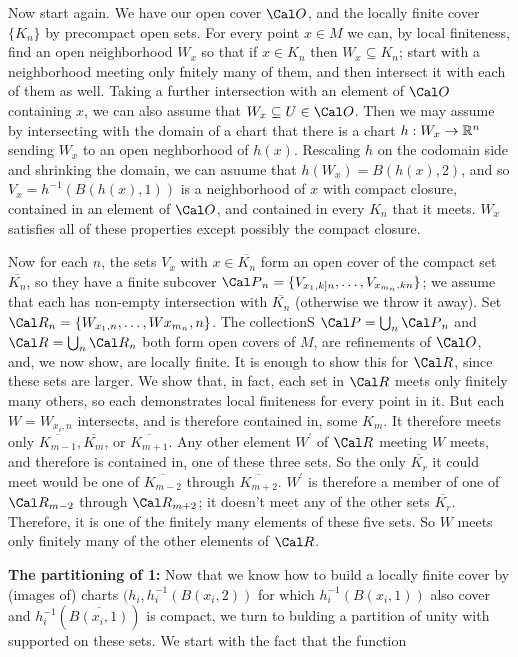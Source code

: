 \ssk

Now start again. We have our open cover ${\Cal O}$, and the locally finite cover $\{K_n\}$ by 
precompact open sets. For every point $x\in M$ we can, by local finiteness, find an open neighborhood $W_x$ so that
if $x\in K_n$ then $W_x\subseteq K_n$; start with a neighborhood meeting only fnitely many of them, and then
intersect it with each of them as well. Taking a further intersection with an element of $\Cal O$ containing
$x$, we can also assume that $W_x\subseteq U\in {\Cal O}$. Then we may assume by intersecting with 
the domain of a chart
that there is a chart $h:W_x\rightarrow {\Bbb R}^n$ sending $W_x$ to an open neghborhood of $h(x)$. Rescaling
$h$ on the codomain side and shrinking the domain, we can asuume that $h(W_x)=B(h(x),2)$, and 
so $V_x=h^{-1}(B(h(x),1))$ is a neighborhood of $x$ with compact closure, contained in an element of
$\Cal O$, and contained in every $K_n$ that it meets. $W_x$ satisfies all of these properties
except possibly the compact closure.

Now for each $n$, the sets $V_x$ with $x\in \overline{K_n}$ form an open cover of the compact set $\overline{K_n}$,
so they have a finite subcover ${\Cal P}_n=\{V_{x_1,k]n},\ldots ,V_{x_{m_n},kn}\}$; we assume that each
has non-empty intersection with $\overline{K_n}$ (otherwise we throw it away). 
Set ${\Cal R}_n=\{W_{x_1,n},\ldots ,W{x_{m_n},n}\}$. The collectionS
$\Cal P=\bigcup_n{\Cal P}_n$  and ${\Cal R}=\bigcup_n{\Cal R}_n$ both form open covers of $M$, are
refinements of $\Cal O$, and, we now show, are locally finite. It is enough to show this for $\Cal R$,
since these sets are larger. We show that, in fact, each set in $\Cal R$ meets only
finitely many others, so each demonstrates local finiteness for every point in it.
But each $W=W_{x_i,n}$ intersects, and is therefore contained in, some $K_m$. 
It therefore meets only $\overline{K_{m-1}}, \overline{K_m}$, or $\overline{K_{m+1}}$. 
Any other element $W^\prime$ of $\Cal R$ meeting $W$ meets, and therefore is contained in, one of these three
sets. So the only $\overline{K_r}$ it could meet would be one of $\overline{K_{m-2}}$
through $\overline{K_{m+2}}$. $W^\prime$ is therefore a member of one of ${\Cal R}_{m-2}$ through
${\Cal R}_{m+2}$; it doesn't meet any of the other sets $\overline{K_r}$. Therefore, it is
one of the finitely many elements of these five sets. So $W$ meets only finitely many of the other
elements of $\Cal R$. 

\msk

{\bf The partitioning of 1:} Now that we know how to build a locally finite cover by (images of) charts $(h_i,h_i^{-1}(B(x_i,2))$
for which $h_i^{-1}(B(x_i,1))$ also cover and $h_i^{-1}(\overline{B(x_i,1)})$ is compact, we turn 
to bulding a partition of unity with supported on these sets. We start with the fact
that the function

